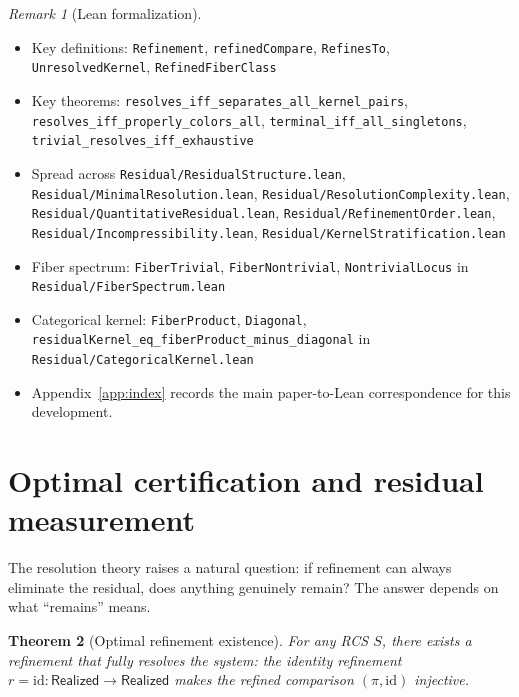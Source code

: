 \documentclass[11pt,a4paper]{article}
\theoremstyle{plain}
\newtheorem{theorem}{Theorem}[section]
\theoremstyle{definition}
\theoremstyle{remark}
\newtheorem{remark}[theorem]{Remark}
\newcommand{\Real}{\mathsf{Realized}}
\newcommand{\compare}{\pi}
\begin{document}
\begin{remark}[Lean formalization]
\leavevmode\par\begin{itemize}[nosep,leftmargin=*,before=\raggedright]
\item Key definitions: \texttt{Refinement}, \texttt{refinedCompare}, \texttt{RefinesTo}, \texttt{UnresolvedKernel}, \texttt{RefinedFiberClass}
\item Key theorems: \texttt{resolves\_iff\_separates\_\allowbreak{}all\_kernel\_pairs}, \texttt{resolves\_iff\_properly\_\allowbreak{}colors\_all}, \texttt{terminal\_iff\_all\_\allowbreak{}singletons}, \texttt{trivial\_resolves\_iff\_exhaustive}
\item Spread across \texttt{Residual/ResidualStructure.lean}, \texttt{Residual/MinimalResolution.lean}, \texttt{Residual/ResolutionComplexity.lean}, \texttt{Residual/QuantitativeResidual.lean}, \texttt{Residual/RefinementOrder.lean}, \texttt{Residual/Incompressibility.lean}, \texttt{Residual/KernelStratification.lean}
\item Fiber spectrum: \texttt{FiberTrivial}, \texttt{FiberNontrivial}, \texttt{NontrivialLocus} in \texttt{Residual/FiberSpectrum.lean}
\item Categorical kernel: \texttt{FiberProduct}, \texttt{Diagonal}, \texttt{residualKernel\_eq\_\allowbreak{}fiberProduct\_minus\_diagonal} in \texttt{Residual/CategoricalKernel.lean}
\item Appendix~\ref{app:index} records the main paper-to-Lean correspondence for this development.
\end{itemize}
\end{remark}

\section{Optimal certification and residual measurement}\label{sec:optimal}

The resolution theory raises a natural question: if refinement can always
eliminate the residual, does anything genuinely remain? The answer depends
on what ``remains'' means.

\begin{theorem}[Optimal refinement existence]\label{thm:opt-exist}
For any RCS $S$, there exists a refinement that fully resolves the system:
the identity refinement $r = \mathrm{id} : \Real \to \Real$ makes the
refined comparison $(\compare, \mathrm{id})$ injective.
\end{theorem}
\end{document}

